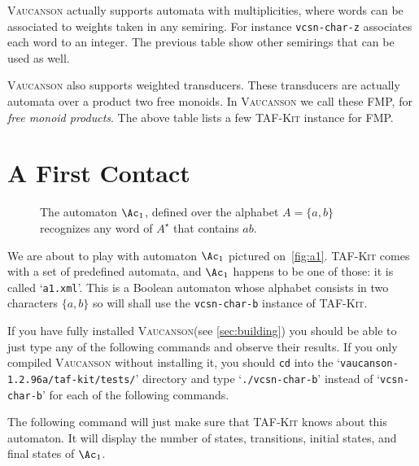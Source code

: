 \documentclass[a4paper]{report}
\def\VcsnVersion{1.2.96a}
\newcommand\file[1]{`\texttt{#1}'}
\newcommand\command[1]{\texttt{#1}}
\newcommand\samp[1]{`\texttt{#1}'}
\newcommand{\tafkit}{\textsc{TAF-Kit}\xspace}
\newcommand{\Vauc}{\textsc{Vaucanson}\xspace}
\begin{document}
\Vauc actually supports automata with multiplicities, where words can
be associated to weights taken in any semiring.  For instance
\command{vcsn-char-z} associates each word to an integer.  The previous
table show other semirings that can be used as well.

\Vauc also supports weighted transducers.  These transducers are
actually automata over a product two free monoids.  In \Vauc we call
these FMP, for \emph{free monoid products}.  The above table lists a
few \tafkit instance for FMP.

\section{A First Contact}\label{sec:firstcontact}

\begin{figure}[tbp] \centering
  \caption{The automaton $\Ac_1$, defined over the alphabet
    $A=\{a,b\}$ recognizes any word of $A^\star$ that
    contains $ab$. \label{fig:a1}}
\end{figure}

We are about to play with automaton $\Ac_1$ pictured
on~\autoref{fig:a1}.  \tafkit comes with a set of predefined automata,
and $\Ac_1$ happens to be one of those: it is called \file{a1.xml}.
This is a Boolean automaton whose alphabet consists in two characters
$\{a,b\}$ so will shall use the \command{vcsn-char-b} instance of
\tafkit.

If you have fully installed \Vauc (see \autoref{sec:building}) you
should be able to just type any of the following commands and observe
their results.  If you only compiled \Vauc without installing it, you
should \command{cd} into the
\file{vaucanson-\VcsnVersion/taf-kit/tests/} directory and type
\samp{./vcsn-char-b} instead of \samp{vcsn-char-b} for each of the
following commands.

The following command will just make sure that \tafkit knows about
this automaton.  It will display the number of states, transitions,
initial states, and final states of $\Ac_1$.
\end{document}
